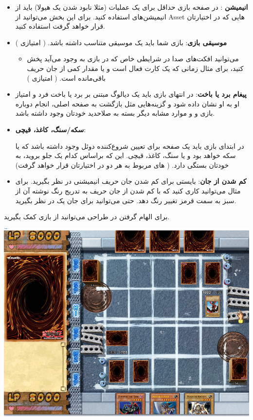 \documentclass[]{article}
\begin{document}
\begin{itemize}
    \item \textbf{انیمیشن }:
     در صفحه بازی حداقل برای یک عملیات (مثلا نابود شدن یک هیولا) باید از انیمیشن‌های  استفاده کنید. برای این بخش می‌توانید از Asset هایی که در اختیارتان قرار خواهد گرفت استفاده کنید.
     
     
    \item \textbf{موسیقی بازی}: بازی شما باید یک موسیقی متناسب داشته باشد. ( امتیازی ) 
    \begin{itemize}
        \item می‌توانید افکت‌های صدا در شرایطی خاص که در بازی به وجود می‌آید پخش کنید، برای مثال زمانی که یک کارت  فعال است و یا مقدار کمی از جان حریف باقی‌مانده است. ( امتیازی‌ )
    \end{itemize}
    \item \textbf{پیغام برد یا باخت}: در انتهای بازی باید یک دیالوگ مبتنی بر برد یا باخت فرد و امتیاز او به او نشان داده شود و گزینه‌هایی مثل بازگشت به صفحه اصلی، انجام دوباره بازی و و موارد مشابه دیگر بسته به صلاحدید خودتان وجود داشته باشد.
    \item \textbf{سکه/سنگ، کاغذ، قیچی}:
    
     در ابتدای بازی باید یک صفحه برای تعیین شروع‌کننده دوئل وجود داشته باشد که یا سکه خواهد بود و یا سنگ‌، کاغذ، قیچی. این که براساس کدام یک جلو بروید،‌ به خودتان بستگی دارد. (  های مربوط به هر دو در اختیارتان قرار خواهد گرفت)
     
     
    \item \textbf{کم شدن از جان}: بایستی برای کم شدن جان حریف انیمیشنی در نظر بگیرید. برای مثال می‌توانید کاری کنید که با کم شدن از جان حریف به تدریج رنگ نوشته آن از سبز به سمت قرمز تغییر رنگ دهد. حتی می‌توانید برای جان یک  در نظر بگیرید.
\end{itemize}
برای الهام گرفتن در طراحی می‌توانید از بازی  کمک بگیرید.
\begin{center}
\includegraphics[width = 0.7 \textwidth]{images/2.png}
	
\end{center}
\end{document}
